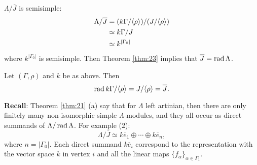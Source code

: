 \begin{exam}
$\Lambda/\overline{J}$ is semisimple: 
\begin{align}
\Lambda/\overline{J} & = (k\Gamma/\langle\rho\rangle)/(J/\langle\rho\rangle)\notag\\ 
& \simeq k\Gamma/J\notag\\
& \simeq k^{|\Gamma_0|}\notag
\end{align}
where $k^{|\Gamma_0|}$ is semisimple.  Then Theorem \ref{thm:23}
implies that $\overline{J} = \operatorname{rad}\nolimits\Lambda$. 
\end{exam}

\begin{prop}\label{prop:24}
Let $(\Gamma,\rho)$ and $k$ be as above.  Then
\[\operatorname{rad}\nolimits k\Gamma/\langle\rho\rangle = J/\langle\rho\rangle =
  \overline{J}.\]
\end{prop}

\textbf{Recall}: Theorem \ref{thm:21} (a) say that for $\Lambda$ left
artinian, then there are only finitely many non-isomorphic simple
$\Lambda$-modules, and they all occur as direct summands of
$\Lambda/\operatorname{rad}\nolimits\Lambda$.  For example (2):
\[\Lambda/\overline{J} \simeq k\overline{e}_1 \oplus \cdots \oplus
  k\overline{e}_n,\]
where $n = |\Gamma_0|$.  Each direct summand $k\overline{e}_i$
correspond to the representation with the vector space $k$ in vertex
$i$ and all the linear maps $\{f_\alpha\}_{\alpha\in\Gamma_1}$. 
